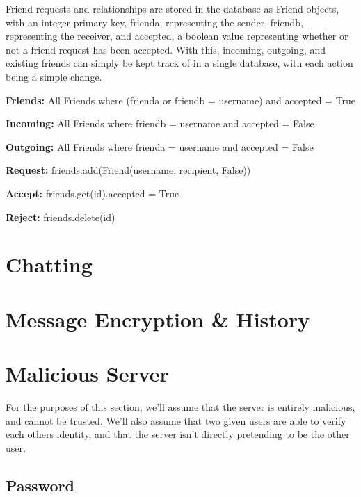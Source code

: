 \documentclass[12pt]{article}
\begin{document}
Friend requests and relationships are stored in the database as Friend objects, with an integer primary key, frienda, representing the sender, friendb, representing the receiver, and accepted, a boolean value representing whether or not a friend request has been accepted. With this, incoming, outgoing, and existing friends can simply be kept track of in a single database, with each action being a simple change.
\newline

\noindent \textbf{Friends:} All Friends where (frienda or friendb = username) and accepted = True
\newline

\noindent \textbf{Incoming:} All Friends where friendb = username and accepted = False
\newline

\noindent \textbf{Outgoing:} All Friends where frienda = username and accepted = False
\newline

\noindent \textbf{Request:} friends.add(Friend(username, recipient, False))
\newline

\noindent \textbf{Accept:} friends.get(id).accepted = True
\newline

\noindent \textbf{Reject:} friends.delete(id)

\section{Chatting}
\section{Message Encryption \& History}

\section{Malicious Server}

For the purposes of this section, we'll assume that the server is entirely malicious, and cannot be trusted. We'll also assume that two given users are able to verify each others identity, and that the server isn't directly pretending to be the other user.

\subsection{Password}
\end{document}
